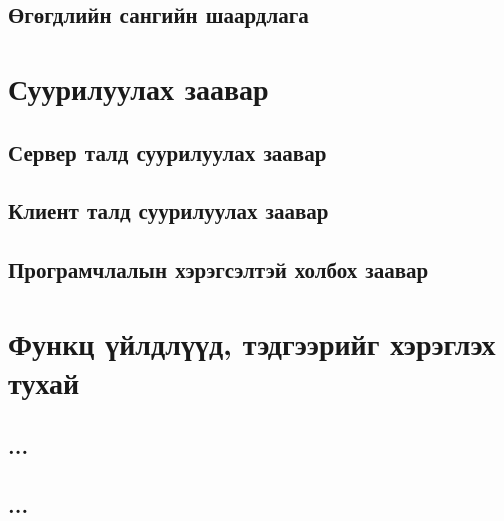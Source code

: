     \subsection{Өгөгдлийн сангийн шаардлага}
\section{Суурилуулах заавар}
    \subsection{Сервер талд суурилуулах заавар}
    \subsection{Клиент талд суурилуулах заавар}
    \subsection{Програмчлалын хэрэгсэлтэй холбох заавар}
\section{Функц үйлдлүүд, тэдгээрийг хэрэглэх тухай}
    \subsection{...}
    \subsection{...}